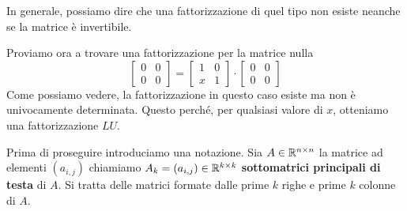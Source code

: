 In generale, possiamo dire che una fattorizzazione di quel tipo non esiste neanche se la matrice è invertibile.

\begin{example}
	Proviamo ora a trovare una fattorizzazione per la matrice nulla
	\[
		\begin{bmatrix}
			0 & 0 \\
			0 & 0
		\end{bmatrix} =
		\begin{bmatrix}
			1 & 0 \\
			x & 1
		\end{bmatrix} \cdot
		\begin{bmatrix}
			0 & 0 \\
			0 & 0
		\end{bmatrix}
	\]
	Come possiamo vedere, la fattorizzazione in questo caso esiste ma non è univocamente determinata. Questo
	perché, per qualsiasi valore di $x$, otteniamo una fattorizzazione $LU$.
\end{example}

Prima di proseguire introduciamo una notazione. Sia $A \in \mathbb{R}^{n \times n}$ la matrice ad elementi $(a_{i,j})$
chiamiamo $A_k = (a_{i,j}) \in \mathbb{R}^{k \times k}$ \textbf{sottomatrici principali di testa} di $A$. Si tratta delle
matrici formate dalle prime $k$ righe e prime $k$ colonne di $A$.

